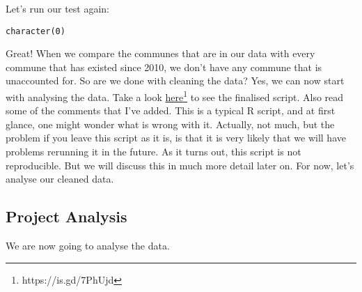 \documentclass[
  letterpaper,
  DIV=11,
  numbers=noendperiod]{scrartcl}
\newenvironment{Shaded}{\begin{snugshade}}{\end{snugshade}}
\newcommand{\CommentTok}[1]{\textcolor[rgb]{0.37,0.37,0.37}{#1}}
\newcommand{\FunctionTok}[1]{\textcolor[rgb]{0.28,0.35,0.67}{#1}}
\newcommand{\NormalTok}[1]{\textcolor[rgb]{0.00,0.23,0.31}{#1}}
\newcommand{\OtherTok}[1]{\textcolor[rgb]{0.00,0.23,0.31}{#1}}
\newcommand{\SpecialCharTok}[1]{\textcolor[rgb]{0.37,0.37,0.37}{#1}}
\newcommand{\StringTok}[1]{\textcolor[rgb]{0.13,0.47,0.30}{#1}}
\begin{document}
\begin{Shaded}
\end{Shaded}

Let's run our test again:

\begin{Shaded}
\end{Shaded}

\begin{verbatim}
character(0)
\end{verbatim}

Great! When we compare the communes that are in our data with every
commune that has existed since 2010, we don't have any commune that is
unaccounted for. So are we done with cleaning the data? Yes, we can now
start with analysing the data. Take a look
\href{https://raw.githubusercontent.com/b-rodrigues/rap4all/master/scripts/save_data.R}{here}\footnote{https://is.gd/7PhUjd}
to see the finalised script. Also read some of the comments that I've
added. This is a typical R script, and at first glance, one might wonder
what is wrong with it. Actually, not much, but the problem if you leave
this script as it is, is that it is very likely that we will have
problems rerunning it in the future. As it turns out, this script is not
reproducible. But we will discuss this in much more detail later on. For
now, let's analyse our cleaned data.

\hypertarget{project-analysis}{%
\subsection{Project Analysis}\label{project-analysis}}

We are now going to analyse the data.
\end{document}

